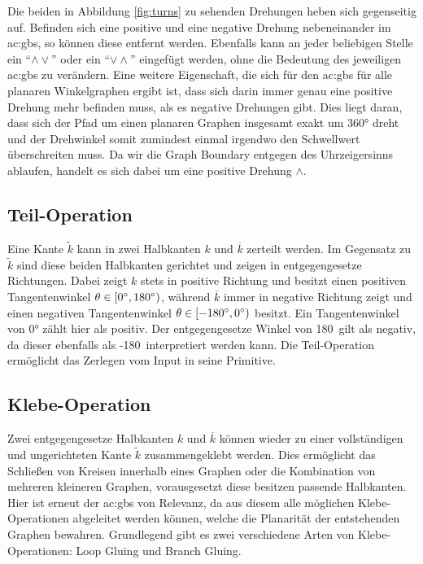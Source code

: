 Die beiden in Abbildung \ref{fig:turns} zu sehenden Drehungen heben sich gegenseitig auf. Befinden sich eine positive und eine negative Drehung
nebeneinander im \gls{ac:gbs}, so können diese entfernt werden. Ebenfalls kann an jeder beliebigen Stelle ein ``\(\wedge\vee\)'' oder ein
``\(\vee\wedge\)'' eingefügt werden, ohne die Bedeutung des jeweiligen \gls{ac:gbs} zu verändern. Eine weitere Eigenschaft, die sich für den \gls{ac:gbs}
für alle planaren Winkelgraphen ergibt ist, dass sich darin immer genau eine positive Drehung mehr befinden muss, als es negative Drehungen gibt.
Dies liegt daran, dass sich der Pfad um einen planaren Graphen insgesamt exakt um 360° dreht und der Drehwinkel somit zumindest einmal irgendwo
den Schwellwert überschreiten muss. Da wir die Graph Boundary entgegen des Uhrzeigersinns ablaufen,
handelt es sich dabei um eine positive Drehung \(\wedge\).

\subsection{Teil-Operation}
Eine Kante \(\tilde{k}\) kann in zwei Halbkanten \(k\) und \(\overline{k}\) zerteilt werden. Im Gegensatz zu \(\tilde{k}\)
sind diese beiden Halbkanten gerichtet und zeigen in entgegengesetze Richtungen. Dabei zeigt \(k\) stets in positive Richtung und besitzt einen
positiven Tangentenwinkel \(\theta \in [0\degree,180\degree) \), während \(\overline{k}\) immer in negative Richtung zeigt und einen negativen
Tangentenwinkel \(\theta \in [-180\degree,0\degree) \) besitzt. Ein Tangentenwinkel von 0° zählt hier als positiv. Der entgegengesetze Winkel
von 180\degree\ gilt als negativ, da dieser ebenfalls als -180\degree\ interpretiert werden kann. Die Teil-Operation ermöglicht das Zerlegen vom
Input in seine Primitive.

\subsection{Klebe-Operation}
Zwei entgegengesetze Halbkanten \(k\) und \(\overline{k}\) können wieder zu einer vollständigen und ungerichteten Kante
\(\tilde{k}\) zusammengeklebt werden. Dies ermöglicht das Schließen von Kreisen innerhalb eines Graphen oder die Kombination von mehreren
kleineren Graphen, vorausgesetzt diese besitzen passende Halbkanten. Hier ist erneut der \gls{ac:gbs} von Relevanz, da aus diesem alle
möglichen Klebe-Operationen abgeleitet werden können, welche die Planarität der entstehenden Graphen bewahren. Grundlegend gibt es zwei
verschiedene Arten von Klebe-Operationen: Loop Gluing und Branch Gluing.

